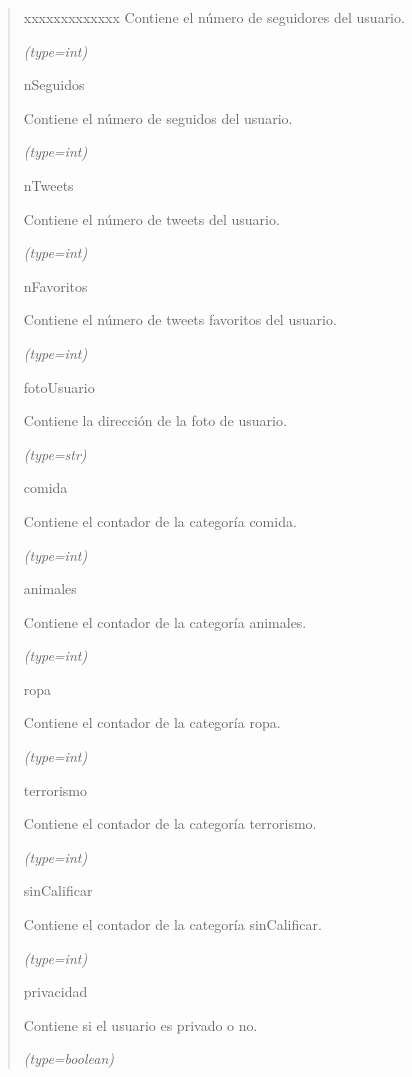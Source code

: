 \begin{boxedminipage}{\funcwidth}
\begin{quote}
\begin{Ventry}{xxxxxxxxxxxxx}
          Contiene el número de seguidores del usuario.

            {\it (type=int)}

          \item[nSeguidos]

          Contiene el número de seguidos del usuario.

            {\it (type=int)}

          \item[nTweets]

          Contiene el número de tweets del usuario.

            {\it (type=int)}

          \item[nFavoritos]

          Contiene el número de tweets favoritos del usuario.

            {\it (type=int)}

          \item[fotoUsuario]

          Contiene la dirección de la foto de usuario.

            {\it (type=str)}

          \item[comida]

          Contiene el contador de la categoría comida.

            {\it (type=int)}

          \item[animales]

          Contiene el contador de la categoría animales.

            {\it (type=int)}

          \item[ropa]

          Contiene el contador de la categoría ropa.

            {\it (type=int)}

          \item[terrorismo]

          Contiene el contador de la categoría terrorismo.

            {\it (type=int)}

          \item[sinCalificar]

          Contiene el contador de la categoría sinCalificar.

            {\it (type=int)}

          \item[privacidad]

          Contiene si el usuario es privado o no.

            {\it (type=boolean)}

        \end{Ventry}

      \end{quote}

    \end{boxedminipage}

